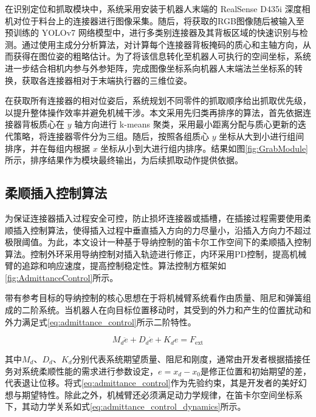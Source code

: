 \documentclass{Diploma}
\begin{document}
%

在识别定位和抓取模块中，系统采用安装于机器人末端的 RealSense D435i 深度相机对位于料台上的连接器进行图像采集。随后，将获取的RGB图像随后被输入至预训练的 YOLOv7 网络模型中，进行多类别连接器及其背板区域的快速识别与检测。通过使用主成分分析算法，对计算每个连接器背板掩码的质心和主轴方向，从而获得在图位姿的粗略估计。为了将该信息转化至机器人可执行的空间坐标，系统进一步结合相机内参与外参矩阵，完成图像坐标系向机器人末端法兰坐标系的转换，获取各连接器相对于末端执行器的三维位姿。

在获取所有连接器的相对位姿后，系统规划不同零件的抓取顺序给出抓取优先级，以提升整体操作效率并避免机械干涉。本文采用先归类再排序的算法，首先依据连接器背板质心在 $y$ 轴方向进行 k-means 聚类，采用最小距离分配与质心更新的迭代策略\cite{ikotun2023k}，将连接器零件分为三组。随后，按照各组质心 $y$ 坐标从大到小进行组间排序，并在每组内根据 $x$ 坐标从小到大进行组内排序。结果如图\ref{fig:GrabModule}所示，排序结果作为模块最终输出，为后续抓取动作提供依据。
\subsection{柔顺插入控制算法}
为保证连接器插入过程安全可控，防止损坏连接器或插槽，在插接过程需要使用柔顺插入控制算法，使得插入过程中垂直插入方向的力尽量小，沿插入方向力不超过极限阈值。为此，本文设计一种基于导纳控制\cite{calanca2015review}的笛卡尔工作空间下的柔顺插入控制算法。控制外环采用导纳控制对插入轨迹进行修正，内环采用PD控制，提高机械臂的追踪和响应速度，提高控制稳定性。算法控制方框架如\ref{fig:AdmittanceControl}所示。

%


带有参考目标的导纳控制的核心思想在于将机械臂系统看作由质量、阻尼和弹簧组成的二阶系统。当机器人在向目标位置移动时，其受到的外力和产生的位置扰动和外力满足式\eqref{eq:admittance_control}所示二阶特性。

\begin{equation} \label{eq:admittance_control}
M_d \ddot{e} + D_d \dot{e} + K_d e = F_{\text{ext}}
\end{equation}

其中$M_d$、$D_d$、$K_d$分别代表系统期望质量、阻尼和刚度，通常由开发者根据插接任务对系统柔顺性能的需求进行参数设定，$e = x_d - x_0$是修正位置和初始期望的差，代表退让位移。将式\eqref{eq:admittance_control}作为先验约束，其是开发者的美好幻想与期望特性。除此之外，机械臂还必须满足动力学规律，在笛卡尔空间坐标系下，其动力学关系如式\eqref{eq:admittance_control_dynamics}所示。
\end{document}
